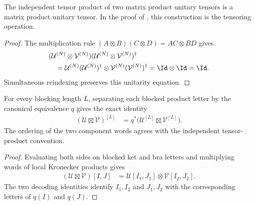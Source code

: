 \begin{lemma}
    \label{thm:mpu_tensor_product}
    \leanok
    The independent tensor product of two matrix product unitary tensors is a
    matrix product unitary tensor. In the proof of \cite[Theorem~IV.6(ii)]{Cirac2017MPU}, this construction is the tensoring
    operation.
\end{lemma}

\begin{proof}\leanok
    The multiplication rule $(A\otimes B)(C\otimes D)=AC\otimes BD$ gives
    \begin{align}
         & (\mathcal U^{(N)}\otimes\mathcal V^{(N)})
        (\mathcal U^{(N)}\otimes\mathcal V^{(N)})^\dagger   \\
         & \quad=\mathcal U^{(N)}(\mathcal U^{(N)})^\dagger
        \otimes\mathcal V^{(N)}(\mathcal V^{(N)})^\dagger
        =\Id\otimes\Id=\Id.
    \end{align}
    Simultaneous reindexing preserves this unitarity equation.
\end{proof}

\begin{lemma}
    \label{thm:mpu_block_tensor_product}
    \leanok
    For every blocking length $L$, separating each blocked product letter by
    the canonical equivalence $q$ gives the exact identity
    \begin{align}
        (\mathcal U\boxtimes\mathcal V)^{[L]}
         & =q^*\bigl(\mathcal U^{[L]}\boxtimes\mathcal V^{[L]}\bigr).
    \end{align}
    The ordering of the two component words agrees with the independent
    tensor-product convention.
\end{lemma}

\begin{proof}\leanok
    Evaluating both sides on blocked ket and bra letters and multiplying words of
    local Kronecker products gives
    \begin{align}
        (\mathcal U\boxtimes\mathcal V)[I,J]
         & =\mathcal U[I_1,J_1]\otimes\mathcal V[I_2,J_2].
    \end{align}
    The two decoding identities identify $I_1,I_2$ and $J_1,J_2$ with the
    corresponding letters of $q(I)$ and $q(J)$.
\end{proof}


